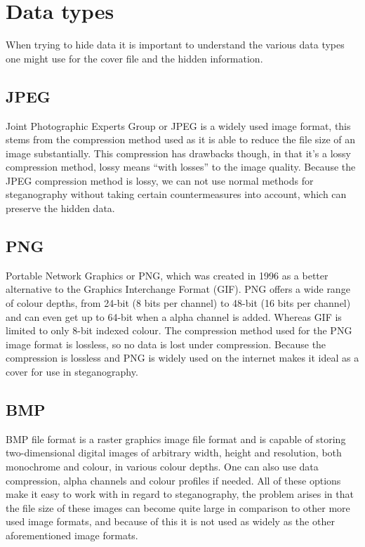 \section{Data types}
When trying to hide data it is important to understand the various data types one might use for the cover file and the hidden information.

\subsection{JPEG}
Joint Photographic Experts Group or JPEG is a widely used image format, this stems from the compression method used as it is able to reduce the file size of an image substantially.
This compression has drawbacks though, in that it's a lossy compression method, lossy means ``with losses'' to the image quality.
Because the JPEG compression method is lossy, we can not use normal methods for steganography without taking certain countermeasures into account, which can preserve the hidden data.
\iffalse{TODO: need to specify which countermeasures and rewrite the ending}\fi


\subsection{PNG}
Portable Network Graphics or PNG, which was created in 1996 as a better alternative to the Graphics Interchange Format (GIF).
PNG offers a wide range of colour depths, from 24-bit (8 bits per channel) to 48-bit (16 bits per channel) and can even get up to 64-bit when a alpha channel is added.
Whereas GIF is limited to only 8-bit indexed colour.
The compression method used for the PNG image format is lossless, so no data is lost under compression.
Because the compression is lossless and PNG is widely used on the internet makes it ideal as a cover for use in steganography.


\subsection{BMP}
BMP file format is a raster graphics image file format and is capable of storing two-dimensional digital images of arbitrary width, height and resolution, both monochrome and colour, in various colour depths. 
One can also use data compression, alpha channels and colour profiles if needed.
All of these options make it easy to work with in regard to steganography, the problem arises in that the file size of these images can become quite large in comparison to other more used image formats, and because of this it is not used as widely as the other aforementioned image formats.



